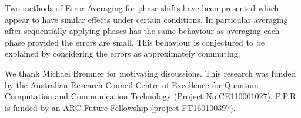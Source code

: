 \documentclass[aps,pra,twocolumn,superscriptaddress,numerical,floatfix]{revtex4-1}
\begin{document}
Two methods of Error Averaging for phase shifts have been presented which appear to have similar effects under certain conditions. In particular averaging after sequentially applying phases has the same behaviour as averaging each phase provided the errors are small. This behaviour is conjectured to be explained by considering the errors as approximately commuting.

\begin{acknowledgments}
	We thank Michael Bremner for motivating discussions. This research was funded by the Australian Research Council Centre of Excellence for Quantum Computation and Communication Technology (Project No.CE110001027). P.P.R is funded by an ARC Future Fellowship (project FT160100397).
\end{acknowledgments}


\end{document}
